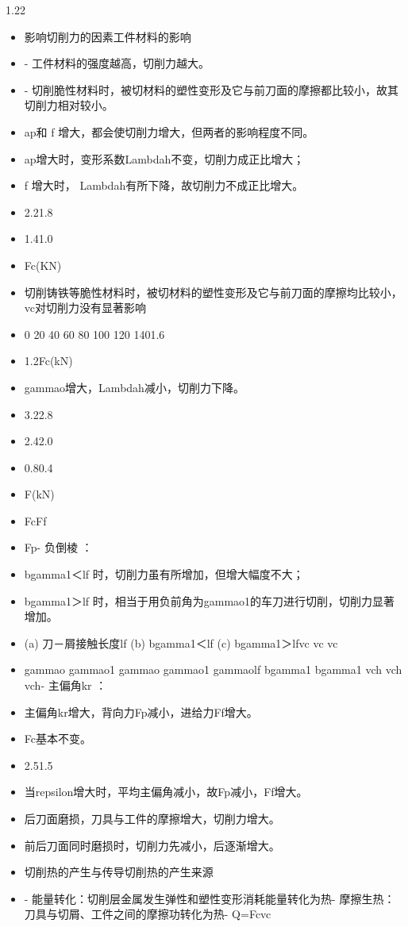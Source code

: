 \documentclass[12pt,a4paper]{article}
\begin{document}
\begin{spacing}{1.22}
\begin{itemize}[leftmargin=2.2em,label=--]
  \item 影响切削力的因素工件材料的影响
  \item - 工件材料的强度越高，切削力越大。
  \item - 切削脆性材料时，被切材料的塑性变形及它与前刀面的摩擦都比较小，故其切削力相对较小。
  \item ap和 f 增大，都会使切削力增大，但两者的影响程度不同。
  \item ap增大时，变形系数Lambdah不变，切削力成正比增大；
  \item f 增大时， Lambdah有所下降，故切削力不成正比增大。
  \item 2.21.8
  \item 1.41.0
  \item Fc(KN)
  \item 切削铸铁等脆性材料时，被切材料的塑性变形及它与前刀面的摩擦均比较小，vc对切削力没有显著影响
  \item 0 20 40 60 80 100 120 1401.6
  \item 1.2Fc(kN)
  \item gammao增大，Lambdah减小，切削力下降。
  \item 3.22.8
  \item 2.42.0
  \item 0.80.4
  \item F(kN)
  \item FcFf
  \item Fp- 负倒棱 ：
  \item bgamma1＜lf 时，切削力虽有所增加，但增大幅度不大；
  \item bgamma1＞lf 时，相当于用负前角为gammao1的车刀进行切削，切削力显著增加。
  \item (a) 刀－屑接触长度lf (b) bgamma1＜lf (c) bgamma1＞lfvc vc vc
  \item gammao gammao1 gammao gammao1 gammaolf bgamma1 bgamma1 vch vch vch- 主偏角kr ：
  \item 主偏角kr增大，背向力Fp减小，进给力Ff增大。
  \item Fc基本不变。
  \item 2.51.5
  \item 当repsilon增大时，平均主偏角减小，故Fp减小，Ff增大。
  \item 后刀面磨损，刀具与工件的摩擦增大，切削力增大。
  \item 前后刀面同时磨损时，切削力先减小，后逐渐增大。
  \item 切削热的产生与传导切削热的产生来源
  \item - 能量转化：切削层金属发生弹性和塑性变形消耗能量转化为热- 摩擦生热：刀具与切屑、工件之间的摩擦功转化为热- Q=Fcvc

\end{itemize}
\end{spacing}
\end{document}
